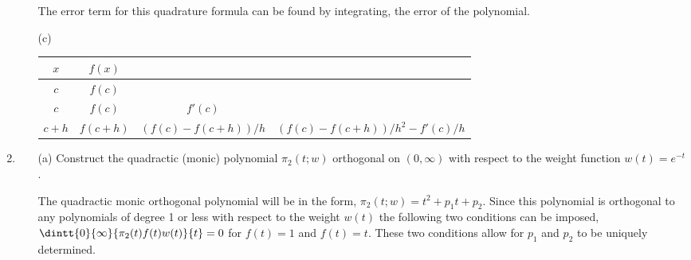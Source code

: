 \documentclass[11pt]{article}
\begin{document}
\begin{enumerate}
\begin{enumerate}
                The error term for this quadrature formula can be found by
                integrating, the error of the polynomial.


            \item[(c)] %
                \begin{tabular}{c|c|c|c}
                    $x$ & $f(x)$ & & \\
                    \midrule
                    $c$ & $f(c)$ & & \\
                    $c$ & $f(c)$ & $f'(c)$ & \\
                    $c+h$ & $f(c+h)$ & $(f(c) - f(c+h))/h$ & $(f(c) - f(c+h))/h^2 - f'(c)/h$
                \end{tabular}
        \end{enumerate}

    \item %
        \begin{enumerate}
            \item[(a)] %
                Construct the quadractic (monic) polynomial
                $\pi_2(t; w)$ orthogonal on $(0, \infty)$ with respect to the
                weight function $w(t) = e^{-t}$.

                The quadractic monic orthogonal polynomial will be in the form,
                $\pi_2(t; w) = t^2 + p_1 t + p_2$.
                Since this polynomial is orthogonal to any polynomials of
                degree 1 or less with respect to the weight $w(t)$ the following
                two conditions can be imposed, 
                $\dintt{0}{\infty}{\pi_2(t) f(t) w(t)}{t} = 0$ for $f(t) = 1$
                and $f(t) = t$.
                These two conditions allow for $p_1$ and $p_2$ to be uniquely
                determined.


\end{enumerate}
\end{enumerate}
\end{document}
